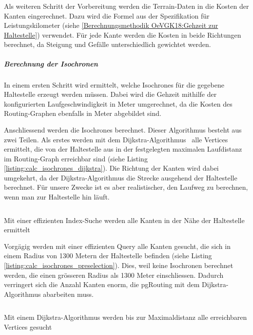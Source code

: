 Als weiteren Schritt der Vorbereitung werden die Terrain-Daten in die Kosten der Kanten eingerechnet.
Dazu wird die Formel aus der Spezifikation für Leistungskilometer (siehe \ref{Berechnungsmethodik OeVGK18:Gehzeit zur Haltestelle}) verwendet.
Für jede Kante werden die Kosten in beide Richtungen berechnet, da Steigung und Gefälle unterschiedlich gewichtet werden.

\subparagraph{Berechnung der Isochronen}
In einem ersten Schritt wird ermittelt, welche \glspl{Isochrone} für die gegebene Haltestelle erzeugt werden müssen.
Dabei wird die Gehzeit mithilfe der konfigurierten Laufgeschwindigkeit in Meter umgerechnet, da die Kosten des Routing-Graphen ebenfalls in Meter abgebildet sind.

Anschliessend werden die \glspl{Isochrone} berechnet.
Dieser Algorithmus besteht aus zwei Teilen.
Als erstes werden mit dem Dijkstra-Algorithmus~\cite{dijkstra_algorithm} alle Vertices ermittelt, die von der Haltestelle aus in der festgelegten maximalen Laufdistanz im Routing-Graph erreichbar sind (siehe Listing \ref{listing:calc_isochrones_dijkstra}).
Die Richtung der Kanten wird dabei umgekehrt, da der Dijkstra-Algorithmus die Strecke ausgehend der Haltestelle berechnet.
Für unsere Zwecke ist es aber realistischer, den Laufweg zu berechnen, wenn man zur Haltestelle hin läuft.

\begin{listing}[ht]
    \inputminted{sql}{projectdoc/listing/calc_isochrones_preselection.sql}
    \caption[Vorselektion der Kanten für die Berechnung von Isochronen]{Mit einer effizienten Index-Suche werden alle Kanten in der Nähe der Haltestelle ermittelt}
    \label{listing:calc_isochrones_preselection}
\end{listing}

Vorgägig werden mit einer effizienten Query alle Kanten gesucht, die sich in einem Radius von 1300 Metern der Haltestelle befinden (siehe Listing \ref{listing:calc_isochrones_preselection}).
Dies, weil keine Isochronen berechnet werden, die einen grösseren Radius als 1300 Meter einschliessen.
Dadurch verringert sich die Anzahl Kanten enorm, die pgRouting mit dem Dijkstra-Algorithmus abarbeiten muss.

\begin{listing}[ht]
    \inputminted{sql}{projectdoc/listing/calc_isochrones_dijkstra.sql}
    \caption[Dijkstra-Algorithmus zur Berechnung von Isochronen]{Mit einem Dijkstra-Algorithmus werden bis zur Maximaldistanz alle erreichbaren Vertices gesucht}
    \label{listing:calc_isochrones_dijkstra}
\end{listing}

